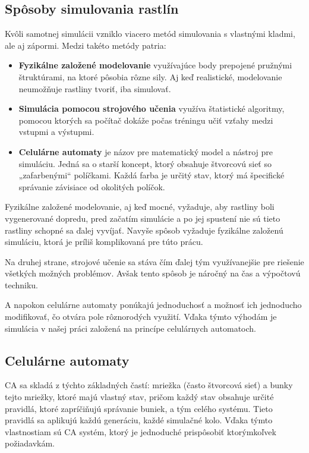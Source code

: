 \documentclass[12pt]{article}
\begin{document}
\subsection{Spôsoby simulovania rastlín}

Kvôli samotnej simulácii vzniklo viacero metód simulovania s vlastnými kladmi,
ale aj zápormi. Medzi takéto metódy patria:

\begin{itemize}
	\item \textbf{Fyzikálne založené modelovanie} využívajúce body prepojené
	      pružnými štruktúrami, na ktoré pôsobia rôzne sily. Aj keď realistické,
	      modelovanie neumožňuje rastliny tvoriť, iba simulovať.
	\item \textbf{Simulácia pomocou strojového učenia} \cite{wiki:Machine_learning}
	      využíva štatistické
	      algoritmy, pomocou ktorých sa počítač dokáže počas tréningu učiť vzťahy medzi
	      vstupmi a výstupmi.
	\item \textbf{Celulárne automaty} \cite{wiki:Cellular_automaton}
	      je názov pre matematický model a nástroj pre simuláciu. Jedná sa
	      o starší koncept, ktorý obsahuje štvorcovú sieť so „zafarbenými“
	      políčkami. Každá farba je určitý stav, ktorý má špecifické správanie
	      závisiace od okolitých políčok.
\end{itemize}

Fyzikálne založené modelovanie, aj keď mocné, vyžaduje, aby rastliny boli
vygenerované dopredu, pred začatím simulácie a po jej spustení nie sú tieto
rastliny schopné sa ďalej vyvíjať. Navyše spôsob vyžaduje fyzikálne založenú
simuláciu, ktorá je príliš komplikovaná pre túto prácu.

Na druhej strane, strojové učenie sa stáva čím ďalej tým využívanejšie pre
riešenie všetkých možných problémov. Avšak tento spôsob je náročný na čas
a výpočtovú techniku.

A napokon celulárne automaty ponúkajú jednoduchosť a možnosť ich jednoducho
modifikovať, čo otvára pole rôznorodých využití. Vďaka týmto výhodám je simulácia
v našej práci založená na princípe celulárnych automatoch.

\subsection{Celulárne automaty}

CA sa skladá z týchto základných častí: mriežka (často štvorcová sieť)
a bunky tejto mriežky, ktoré majú vlastný stav, pričom každý stav obsahuje
určité pravidlá, ktoré zapríčiňujú správanie buniek, a tým celého systému.
Tieto pravidlá sa aplikujú každú generáciu, každé simulačné kolo.
Vďaka týmto vlastnostiam sú CA systém, ktorý je jednoduché prispôsobiť ktorýmkoľvek
požiadavkám.
\end{document}
